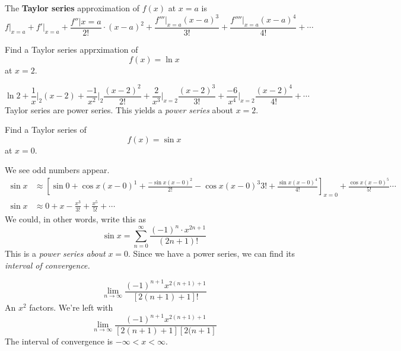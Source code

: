 \begin{theorem}
  The \textbf{Taylor series} approximation of $f(x)$ at $x=a$ is
  \[ f \bigg|_{x=a} + f'\bigg|_{x=a} + \frac{f''\bigg|x=a}{2!} \cdot (x-a)^2 +
    \frac{f'''\bigg|_{x=a} (x-a)^3}{3!} + \frac{f''''\bigg|_{x=a} (x-a)^4}{4!} +
    \cdots\]
  \label{th:taylorseries}
\end{theorem}
\begin{ex}
  Find a Taylor series apprximation of
  \[ f(x) = \ln x \]
  at $x=2$.
  \begin{sol}
    \[ \ln 2 + \frac{1}{x} \bigg|_2 (x-2) + \frac{-1}{x^2} \bigg|_2
      \frac{(x-2)^2}{2!} + \frac{2}{x^3}\bigg|_{x=2} \frac{(x-2)^3}{3!}
      + \frac{-6}{x^4}\bigg|_{x=2} \frac{(x-2)^4}{4!} + \cdots\]
      Taylor series are power series. This yields a \emph{power series} about
      $x=2$.
  \end{sol}
\end{ex}
\begin{ex}
  Find a Taylor series of
  \[ f(x) = \sin x \]
  at $x=0$.
  \begin{sol}
    We see odd numbers appear.
    \begin{align*}
      \sin x &\approx \left[ \sin 0 + \cos x (x-0)^1 + \frac{-\sin x (x-0)^2}{2!} -
      \cos x (x-0)^{3}{3!} + \frac{\sin x (x-0)^4}{4!} \right]_{x=0} + \frac{\cos x
      (x-0)^5}{5!}
      \cdots
      \\
      \sin x &\approx 0+x - \frac{x^3}{3!} + \frac{x^5}{5!} + \cdots
  \end{align*}
  We could, in other words, write this as
  \[ \sin x = \sum_{n=0}^\infty \frac{(-1)^n \cdot x^{2n+1}}{(2n+1)!} \]
  This is a \emph{power series about} $x=0$.
  Since we have a power series, we can find its \emph{interval of convergence.}

  \[ \lim_{n\to\infty} \frac{(-1)^{n+1} x^{2(n+1)+1}}{[2(n+1)+1]!} \]
  An $x^2$ factors.
 We're left with   \[ \lim_{n\to\infty} \frac{(-1)^{n+1}
   x^{2(n+1)+1}}{[2(n+1)+1][2(n+1]} \]
  The interval of convergence is $-\infty<x<\infty$.
  \end{sol}
\end{ex}
